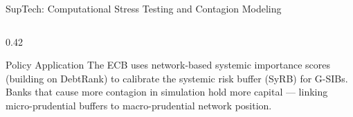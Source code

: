 \begin{frame}{SupTech: Computational Stress Testing and Contagion Modeling}
\begin{columns}[T]
\begin{column}{0.42\textwidth}
      \begin{block}{Policy Application}
        The ECB uses network-based systemic importance scores (building on DebtRank) to calibrate the systemic risk buffer (SyRB) for G-SIBs. Banks that cause more contagion in simulation hold more capital --- linking micro-prudential buffers to macro-prudential network position.
      \end{block}
    \end{column}
  \end{columns}
\end{frame}



